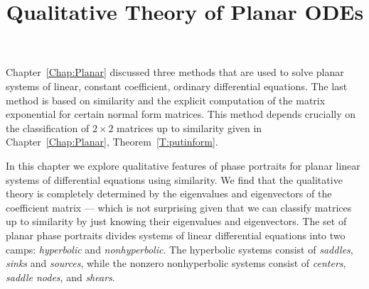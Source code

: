 \documentclass{ximera}
\title{Qualitative Theory of Planar ODEs}
\begin{document}
\begin{abstract}
\end{abstract}
\maketitle

\normalsize

Chapter~\ref{Chap:Planar} discussed three methods that are used to solve
planar systems of linear, constant coefficient, ordinary differential
equations.  The last method is based on similarity and the explicit
computation of the matrix exponential for certain normal form matrices.
This method depends crucially on the classification of $2\times 2$ matrices
up to similarity given in Chapter~\ref{Chap:Planar}, 
Theorem~\ref{T:putinform}.

In this chapter we explore qualitative features of phase portraits for planar 
linear systems of differential equations using similarity.  We find that the 
qualitative theory is completely determined by the eigenvalues and 
eigenvectors of the coefficient matrix --- which is not surprising given
that we can classify matrices up to similarity by just knowing their
eigenvalues and eigenvectors.  The set of planar phase portraits divides 
systems of linear differential equations into two camps: {\em hyperbolic\/} 
and {\em nonhyperbolic\/}.  The hyperbolic systems consist of {\em saddles\/},
{\em sinks\/} and {\em sources\/}, while the nonzero nonhyperbolic systems 
consist of {\em centers\/}, {\em saddle nodes\/}, and {\em shears\/}.
\end{document}
